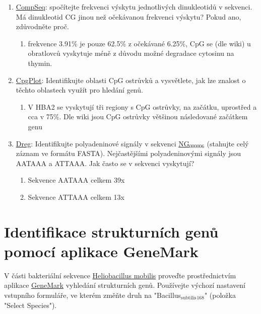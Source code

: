 \documentclass[11pt]{article}
\begin{document}
\begin{enumerate}
\item \href{http://emboss.bioinformatics.nl/cgi-bin/emboss/compseq}{CompSeq}: spočítejte frekvenci výskytu jednotlivých dinukleotidů v
sekvenci. Má dinukleotid CG jinou než očekávanou frekvenci výskytu? Pokud
ano, zdůvodněte proč.
\begin{enumerate}
\item frekvence 3.91\% je pouze 62.5\% z očekávané 6.25\%, CpG se (dle wiki) u
obratlovců vyskytuje méně z důvodu možné degradace cytosinu na thymin.
\end{enumerate}
\item \href{http://emboss.bioinformatics.nl/cgi-bin/emboss/cpgplot}{CpgPlot}: Identifikujte oblasti CpG ostrůvků a vysvětlete, jak lze znalost o
těchto oblastech využít pro hledání genů.
\begin{enumerate}
\item V HBA2 se vyskytují tři regiony s CpG ostrůvky, na začátku, uprostřed a
cca v 75\%. Dle wiki jsou CpG ostrůvky většinou následované začátkem genu
\end{enumerate}
\item \href{http://emboss.bioinformatics.nl/cgi-bin/emboss/dreg}{Dreg}: Identifikujte polyadeninové signály v sekvenci \href{http://www.ncbi.nlm.nih.gov/nuccore/NG\_000006.1}{NG\(_{\text{000006}}\)} (stahujte celý
záznam ve formátu FASTA). Nejčastějšími polyadeninovými signály jsou AATAAA a
ATTAAA. Jak často se v sekvenci vyskytují?
\begin{enumerate}
\item Sekvence AATAAA celkem 39x
\item Sekvence ATTAAA celkem 13x
\end{enumerate}
\end{enumerate}

\section{Identifikace strukturních genů pomocí aplikace GeneMark}
\label{sec:orgbc89d3e}
V části bakteriální sekvence \href{./heliobacillus\_mobilis.txt}{Heliobacillus mobilis} proveďte prostřednictvím
aplikace \href{http://exon.biology.gatech.edu/gmchoice.html}{GeneMark} vyhledání strukturních genů. Používejte výchozí nastavení
vstupního formuláře, ve kterém změňte druh na "Bacillus\(_{\text{subtilis}}\)\(_{\text{168}}\)" (položka
"Select Species").
\end{document}

